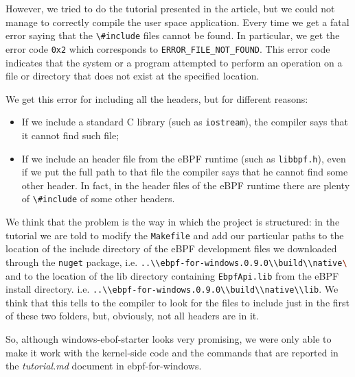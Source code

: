 However, we tried to do the tutorial presented in the article, but we could not manage to correctly compile the user space application.
Every time we get a fatal error saying that the  \colorbox{backcolour}{\lstinline[style=commandline, language=bash]|\#include|} files cannot be found.
In particular, we get the error code \colorbox{backcolour}{\lstinline[style=commandline, language=bash]|0x2|} which corresponds to \colorbox{backcolour}{\lstinline[style=commandline, language=bash]|ERROR_FILE_NOT_FOUND|}. 
This error code indicates that the system or a program attempted to perform an operation on a file or directory that does not exist at the specified location.

We get this error for including all the headers, but for different reasons:

\begin{itemize}
	\item 
		If we include a standard C library (such as \colorbox{backcolour}{\lstinline[style=commandline, language=bash]|iostream|}), the compiler says that it cannot find such file;
	\item 
		If we include an header file from the eBPF runtime (such as \colorbox{backcolour}{\lstinline[style=commandline, language=bash]|libbpf.h|}), even if we put the full path to that file the compiler says that he cannot find some other header.
		In fact, in the header files of the eBPF runtime there are plenty of \colorbox{backcolour}{\lstinline[style=commandline, language=bash]|\#include|} of some other headers.
\end{itemize}

We think that the problem is the way in which the project is structured: in the tutorial we are told to modify the \colorbox{backcolour}{\lstinline[style=commandline, language=bash]|Makefile|} and add our particular paths to the location of the include directory of the eBPF development files we downloaded through the \colorbox{backcolour}{\lstinline[style=commandline, language=bash]|nuget|} package, i.e. \colorbox{backcolour}{\lstinline[style=commandline, language=bash]|..\\ebpf-for-windows.0.9.0\\build\\native\|} and to the location of the lib directory containing \colorbox{backcolour}{\lstinline[style=commandline, language=bash]|EbpfApi.lib|} from the eBPF install directory. i.e. \colorbox{backcolour}{\lstinline[style=commandline, language=bash]|..\\ebpf-for-windows.0.9.0\\build\\native\\lib|}.
We think that this tells to the compiler to look for the files to include just in the first of these two folders, but, obviously, not all headers are in it.

So, although windows-ebof-starter looks very promising, we were only able to make it work with the kernel-side code and the commands that are reported in the \textit{tutorial.md} document in ebpf-for-windows.

